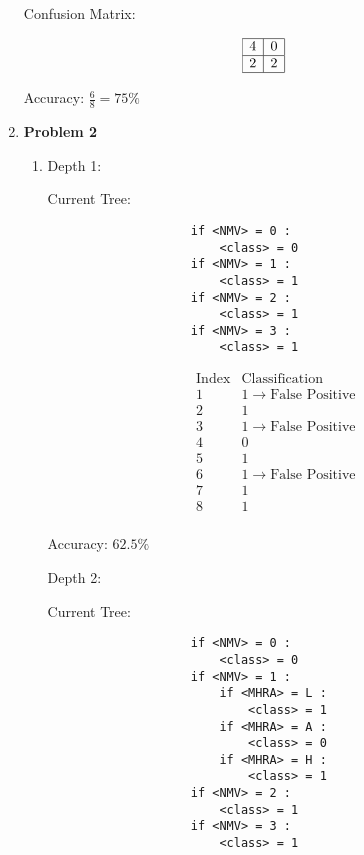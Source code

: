 \begin{enumerate}
		Confusion Matrix:
		
		\[
			\begin{array}{|c|c|}
				\hline
				4 & 0 \\
				\hline
				2 & 2 \\
				\hline
			\end{array}
		\]
		
		Accuracy: \( \frac{6}{8} = 75\% \)
		
	\item{\bf{Problem 2}}

		\begin{enumerate}
		
			\item
			
				Depth 1:
				
				Current Tree:
				
				\begin{lstlisting}
					if <NMV> = 0 :
						<class> = 0
					if <NMV> = 1 :
						<class> = 1
					if <NMV> = 2 :
						<class> = 1
					if <NMV> = 3 :
						<class> = 1
				\end{lstlisting}

				\[
					\begin{array}{c|l}
						\text{Index} & \text{Classification} \\
						\hline
						1 & 1 \rightarrow \text{False Positive} \\
						2 & 1 \\
						3 & 1 \rightarrow \text{False Positive} \\
						4 & 0 \\  
						5 & 1 \\
						6 & 1 \rightarrow \text{False Positive} \\
						7 & 1 \\
						8 & 1 \\
					\end{array}
				\]
		
				Accuracy: \( 62.5\% \)
			
			
				Depth 2:
				
				Current Tree:
				
				\begin{lstlisting}
					if <NMV> = 0 :
						<class> = 0
					if <NMV> = 1 :
						if <MHRA> = L :
							<class> = 1
						if <MHRA> = A :
							<class> = 0
						if <MHRA> = H :
							<class> = 1
					if <NMV> = 2 :
						<class> = 1
					if <NMV> = 3 :
						<class> = 1
				\end{lstlisting}
				

\end{enumerate}
\end{enumerate}
